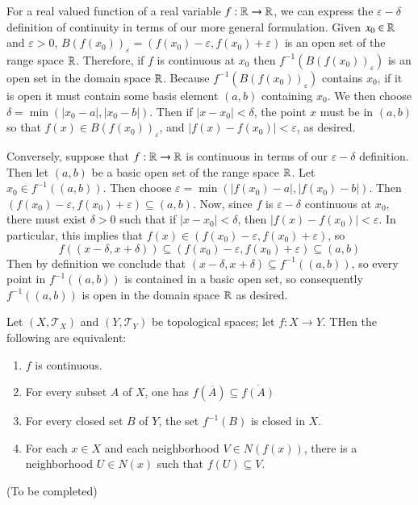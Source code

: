 \documentclass[12pt, a4paper, twoside, openright, titlepage]{book}
\begin{document}
\begin{eg}{}{}
    For a real valued function of a real variable $f:\mathbb R\rightarrow \mathbb R$, we can express the $\varepsilon-\delta$ definition of continuity in terms of our more general formulation. Given $x_0 \in \mathbb R$ and $\varepsilon > 0$, $B(f(x_0))_{\varepsilon} = (f(x_0) - \varepsilon, f(x_0) + \varepsilon)$ is an open set of the range space $\mathbb R$. Therefore, if $f$ is continuous at $x_0$ then $f^{-1}(B(f(x_0))_{\varepsilon})$ is an open set in the domain space $\mathbb R$. Because $f^{-1}(B(f(x_0))_{\varepsilon})$ contains $x_0$, if it is open it must contain some basis element $(a,b)$ containing $x_0$. We then choose $\delta = \min(|x_0 - a|, |x_0 - b|)$. Then if $|x-x_0| < \delta$, the point $x$ must be in $(a,b)$ so that $f(x) \in B(f(x_0))_{\varepsilon}$, and $|f(x)-f(x_0)| < \varepsilon$, as desired.


    Conversely, suppose that $f:\mathbb R\rightarrow \mathbb R$ is continuous in terms of our $\varepsilon-\delta$ definition. Then let $(a,b)$ be a basic open set of the range space $\mathbb R$. Let $x_0 \in f^{-1}((a,b))$. Then choose $\varepsilon = \min(|f(x_0) - a|, |f(x_0) - b|)$. Then $(f(x_0) - \varepsilon, f(x_0) +\varepsilon) \subseteq (a,b)$. Now, since $f$ is $\varepsilon-\delta$ continuous at $x_0$, there must exist $\delta > 0$ such that if $|x - x_0| < \delta$, then $|f(x) - f(x_0)| < \varepsilon$. In particular, this implies that $f(x) \in (f(x_0)-\varepsilon,f(x_0)+\varepsilon)$, so $$f((x-\delta,x+\delta)) \subseteq (f(x_0)-\varepsilon,f(x_0)+\varepsilon) \subseteq (a,b)$$ Then by definition we conclude that $(x-\delta,x+\delta) \subseteq f^{-1}((a,b))$, so every point in $f^{-1}((a,b))$ is contained in a basic open set, so consequently $f^{-1}((a,b))$ is open in the domain space $\mathbb R$ as desired.
\end{eg}



\begin{thm}{}{}
    Let $(X,\mathcal{T}_X)$ and $(Y,\mathcal{T}_Y)$ be topological spaces; let $f:X\rightarrow Y$. THen the following are equivalent: \begin{enumerate}
        \item $f$ is continuous.
        \item For every subset $A$ of $X$, one has $f(\overline{A}) \subseteq \overline{f(A)}$
        \item For every closed set $B$ of $Y$, the set $f^{-1}(B)$ is closed in $X$.
        \item For each $x \in X$ and each neighborhood $V \in N(f(x))$, there is a neighborhood $U \in N(x)$ such that $f(U) \subseteq V$.
    \end{enumerate}
\end{thm}
\begin{proof*}{}{}
    (To be completed)
\end{proof*}
\end{document}
